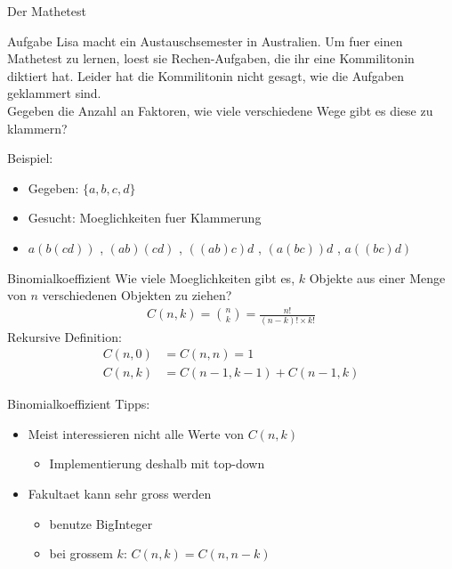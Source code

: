 \documentclass[18pt]{beamer}
\begin{document}
\begin{frame}{Der Mathetest}
\begin{block}{Aufgabe}
Lisa macht ein Austauschsemester in Australien. Um fuer einen Mathetest zu lernen, loest sie Rechen-Aufgaben, die ihr eine Kommilitonin diktiert hat. Leider hat die Kommilitonin nicht gesagt, wie die Aufgaben geklammert sind. \\
Gegeben die Anzahl an Faktoren, wie viele verschiedene Wege gibt es diese zu klammern?
\end{block}
\pause
Beispiel:
\begin{itemize}
\item Gegeben: $\lbrace a, b, c, d \rbrace$
\item Gesucht: Moeglichkeiten fuer Klammerung
\item $ a \left( b \left( c d \right) \right) $ , $\left( a b \right) \left( c d \right) $ , $\left( \left( a b \right) c \right) d$ , $\left( a \left( b  c \right) \right) d $ , $ a \left( \left( b  c \right) d \right) $
\end{itemize}
\end{frame}

\begin{frame}{Binomialkoeffizient}
Wie viele Moeglichkeiten gibt es, $k$ Objekte aus einer Menge von $n$ verschiedenen Objekten zu ziehen?
\pause
\begin{align*}
C\left( n,k \right) = \binom{n}{k} = \frac{n!}{\left( n-k \right) ! \times k!}
\end{align*}
\pause
Rekursive Definition:
\begin{align*}
C\left( n, 0 \right) &= C\left( n,n \right) = 1 \\
C\left( n,k \right) &= C\left( n-1,k-1 \right) + C\left( n-1,k \right)
\end{align*} %

\end{frame}

\begin{frame}{Binomialkoeffizient}
Tipps:
\begin{itemize}
\item Meist interessieren nicht alle Werte von $C \left( n, k \right)$
\begin{itemize}
\item Implementierung deshalb mit top-down
\end{itemize}
\item Fakultaet kann sehr gross werden
\begin{itemize}
\item benutze BigInteger
\item bei grossem $k$: $C \left( n, k \right) = C \left( n, n-k \right)$
\end{itemize}
\end{itemize}
\end{frame}
\end{document}
